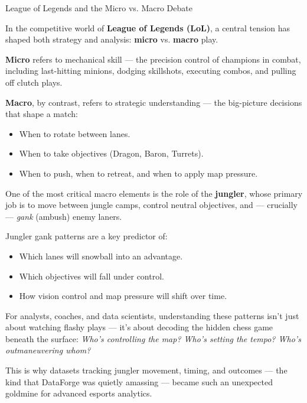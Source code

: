 \begin{HistoricalSidebar}{League of Legends and the Micro vs. Macro Debate}

    In the competitive world of \textbf{League of Legends (LoL)}, a central tension has shaped both strategy and analysis:  
    \textbf{micro} vs. \textbf{macro} play.
    
    \medskip
    
    \textbf{Micro} refers to mechanical skill — the precision control of champions in combat, including last-hitting minions, dodging skillshots, executing combos, and pulling off clutch plays.

    \medskip
    
    \textbf{Macro}, by contrast, refers to strategic understanding — the big-picture decisions that shape a match:

    \medskip

    \begin{itemize}
        \item When to rotate between lanes.
        \item When to take objectives (Dragon, Baron, Turrets).
        \item When to push, when to retreat, and when to apply map pressure.
    \end{itemize}
    
    \medskip
    
    One of the most critical macro elements is the role of the \textbf{jungler}, whose primary job is to move between jungle camps, control neutral objectives, and — crucially — \textit{gank} (ambush) enemy laners.  

    \medskip
    
    Jungler gank patterns are a key predictor of:

    \medskip

    \begin{itemize}
        \item Which lanes will snowball into an advantage.
        \item Which objectives will fall under control.
        \item How vision control and map pressure will shift over time.
    \end{itemize}
    
    \medskip
    
    For analysts, coaches, and data scientists, understanding these patterns isn’t just about watching flashy plays — it’s about decoding the hidden chess game beneath the surface:
    \textit{Who’s controlling the map? Who’s setting the tempo? Who’s outmaneuvering whom?}
    
    \medskip

    This is why datasets tracking jungler movement, timing, and outcomes — the kind that DataForge was quietly amassing — became such an unexpected goldmine for advanced esports analytics.
    
\end{HistoricalSidebar}
    
